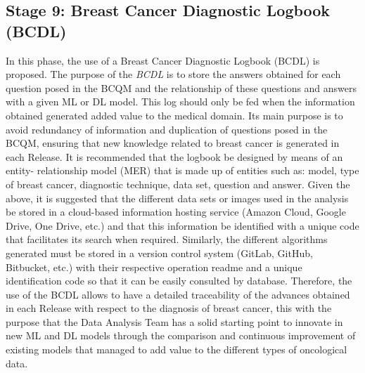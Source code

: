 \subsection*{Stage 9: Breast Cancer Diagnostic Logbook (BCDL)}
In this phase, the use of a Breast Cancer Diagnostic Logbook (BCDL) is proposed. The purpose of the \textit{BCDL} is to store the answers obtained for each question posed in the BCQM and the relationship of these questions and answers with a given ML or DL model. This log should only be fed when the information obtained generated added value to the medical domain. Its main purpose is to avoid redundancy of information and duplication of questions posed in the BCQM, ensuring that new knowledge related to breast cancer is generated in each Release. It is recommended that the logbook be designed by means of an entity- relationship model (MER) that is made up of entities such as: model, type of breast cancer, diagnostic technique, data set, question and answer. Given the above, it is suggested that the different data sets or images used in the analysis be stored in a cloud-based information hosting service (Amazon Cloud, Google Drive, One Drive, etc.) and that this information be identified with a unique code that facilitates its search when required. Similarly, the different algorithms generated must be stored in a version control system (GitLab, GitHub, Bitbucket, etc.) with their respective operation readme and a unique identification code so that it can be easily consulted by database. Therefore, the use of the BCDL allows to have a detailed traceability of the advances obtained in each Release with respect to the diagnosis of breast cancer, this with the purpose that the Data Analysis Team has a solid starting point to innovate in new ML and DL models through the comparison and continuous improvement of existing models that managed to add value to the different types of oncological data.